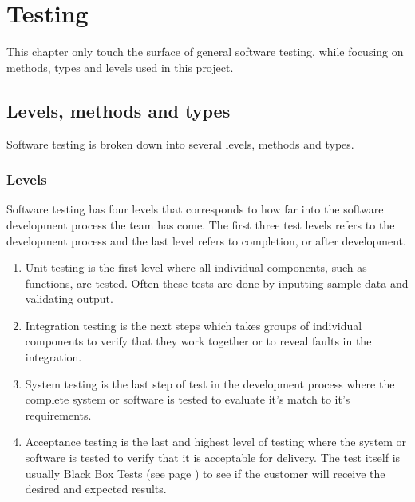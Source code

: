 \chapter{Testing}
This chapter only touch the surface of general software testing, while focusing on methods, types and levels used in this project.
\section{Levels, methods and types}
Software testing is broken down into several levels, methods and types.
\subsection{Levels}
Software testing has four levels that corresponds to how far into the software development process the team has come. The first three test levels refers to the development process and the last level refers to completion, or after development.
\begin{enumerate}
\item Unit testing is the first level where all individual components, such as functions, are tested. Often these tests are done by inputting sample data and validating output.
\item Integration testing is the next steps which takes groups of individual components to verify that they work together or to reveal faults in the integration.
\item System testing is the last step of test in the development process where the complete system or software is tested to evaluate it's match to it's requirements.
\item Acceptance testing is the last and highest level of testing where the system or software is tested to verify that it is acceptable for delivery. The test itself is usually Black Box Tests (see page \pageref{def:blackboxtesting}) to see if the customer will receive the desired and expected results.
\end{enumerate}
